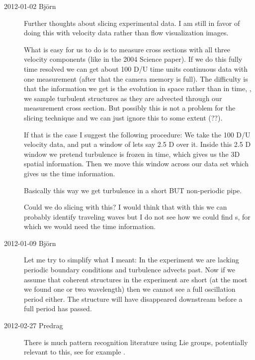 \begin{description}
\item[2012-01-02 Bj\"orn]
Further thoughts about slicing experimental data. I am still in favor of
doing this with velocity data rather than flow visualization images.

What is easy for us to do is to measure cross sections with all three
velocity components (like in the 2004 Science paper). If we do this fully
time resolved we can get about 100 D/U time units continuous data with
one measurement (after that the camera memory is full). The
difficulty is that the information we get is the evolution in space
rather than in time, \ie, we sample turbulent structures as they
are advected through our measurement cross section. But possibly this is
not a problem for the slicing technique and we can just ignore this to
some extent (??).

If that is the case I suggest the following procedure: We take the 100 D/U
velocity data, and put a window of lets say 2.5 D over it. Inside this
2.5 D window we pretend turbulence is frozen in time, which gives us the
3D spatial information. Then we move this window across our data set
which gives us the time information.

Basically this way we get turbulence in a short BUT non-periodic pipe.

Could we do slicing with this? I would think that with this we can
probably identify traveling waves but I do not see how we could find
\rpo s, for which we would need the time information.

\item[2012-01-09 Bj\"orn]
Let me try to simplify what I meant: In the experiment we are lacking
periodic boundary conditions and turbulence advects past. Now if we
assume that coherent structures in the experiment are short (at  the
most we found one or two wavelength) then we cannot see a full
oscillation period either. The structure will have disappeared downstream
before a full period has passed.

\item[2012-02-27 Predrag] There is much pattern recognition literature
using Lie groups, potentially relevant to this, see for example
.

\end{description}
